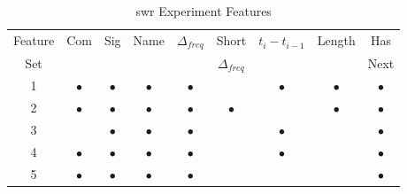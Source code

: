 \begin{table}[h]
\begin{center}

    \begin{tabular}{|c|c|c|c|c|c|c|c|c|}
        \hline
        Feature & Com & Sig & Name & $\Delta_{freq}$ & Short & $t_{i} - t_{i-1}$ & Length & Has \\
        Set & & & & & $\Delta_{freq}$ & & & Next \\ \hline
        1 & $\bullet$ & $\bullet$ & $\bullet$ & $\bullet$ & & $\bullet$ & $\bullet$ & $\bullet$ \\
        2 & $\bullet$ & $\bullet$ & $\bullet$ & $\bullet$ & $\bullet$ & & $\bullet$ & $\bullet$ \\
        3 & & $\bullet$ & $\bullet$ & $\bullet$ & & $\bullet$ & & $\bullet$ \\
        4 & $\bullet$ & $\bullet$ & $\bullet$ & $\bullet$ & & $\bullet$ & & $\bullet$ \\
        5 & $\bullet$ & $\bullet$ & $\bullet$ & $\bullet$ & & & & $\bullet$ \\ \hline
    \end{tabular}
    \caption{\gls{swr} Experiment Features}
    \label{tab:svm_feature_experiment_sets}
\end{center}

\end{table}


